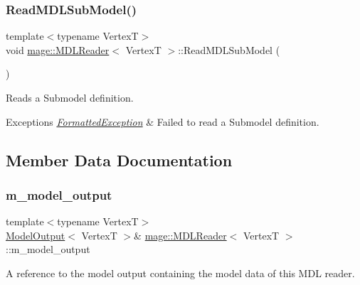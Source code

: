\subsubsection{\texorpdfstring{Read\+M\+D\+L\+Sub\+Model()}{ReadMDLSubModel()}}
{\footnotesize\ttfamily template$<$typename VertexT$>$ \\
void \hyperlink{classmage_1_1_m_d_l_reader}{mage\+::\+M\+D\+L\+Reader}$<$ VertexT $>$\+::Read\+M\+D\+L\+Sub\+Model (\begin{DoxyParamCaption}{ }\end{DoxyParamCaption})\hspace{0.3cm}{\ttfamily [private]}}

Reads a Submodel definition.


\begin{DoxyExceptions}{Exceptions}
{\em \hyperlink{structmage_1_1_formatted_exception}{Formatted\+Exception}} & Failed to read a Submodel definition. \\
\hline
\end{DoxyExceptions}


\subsection{Member Data Documentation}
\hypertarget{classmage_1_1_m_d_l_reader_a41392308792749b78657497b69add850}{}\label{classmage_1_1_m_d_l_reader_a41392308792749b78657497b69add850} 
\subsubsection{\texorpdfstring{m\+\_\+model\+\_\+output}{m\_model\_output}}
{\footnotesize\ttfamily template$<$typename VertexT$>$ \\
\hyperlink{structmage_1_1_model_output}{Model\+Output}$<$ VertexT $>$\& \hyperlink{classmage_1_1_m_d_l_reader}{mage\+::\+M\+D\+L\+Reader}$<$ VertexT $>$\+::m\+\_\+model\+\_\+output\hspace{0.3cm}{\ttfamily [private]}}

A reference to the model output containing the model data of this M\+DL reader. 
